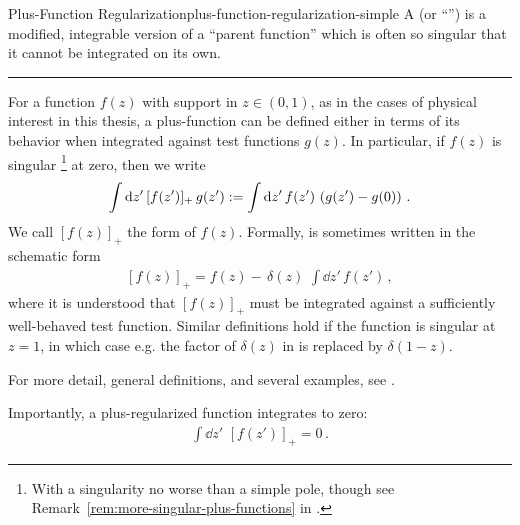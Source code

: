 \begin{definitionbox}{Plus-Function Regularization}{plus-function-regularization-simple}
    A  (or ``'') is a modified, integrable version of a ``parent function'' which is often so singular that it cannot be integrated on its own.

    \vspace{7pt}
    \hrule
    \vspace{7pt}

    For a function \(f(z)\) with support in \(z \in (0,1)\), as in the cases of physical interest in this thesis, a plus-function can be defined either in terms of its behavior when integrated against test functions \(g(z)\).
    In particular, if \(f(z)\) is singular%
    \footnote{With a singularity no worse than a simple pole, though see Remark~\ref{rem:more-singular-plus-functions} in .}
    at zero, then we write
    \begin{align}
        \label{eq:plus-fn-simple-main}
        \int \dd z'
        \,
        [f(z')]_+
        \,
        g(z')
        :=
        \int \dd z'
        \,
        f(z')
        \,
        \le(g(z') - g(0)\ri)
        \,.
    \end{align}
    We call \([f(z)]_+\) the  form of \(f(z)\).
    Formally,  is sometimes written in the schematic form
    \begin{align}
        \label{eq:plus-fn-simple-delta}
        [f(z)]_+
        =
        f(z)
        -
        \,
        \delta(z)
        \,\,
        \int \dd z'
        \,
        f(z')
        \,,
    \end{align}
    where it is understood that \([f(z)]_+\) must be integrated against a sufficiently well-behaved test function.
    Similar definitions hold if the function is singular at \(z=1\), in which case e.g. the factor of \(\delta(z)\) in  is replaced by \(\delta(1-z)\).

    For more detail, general definitions, and several examples, see .
\end{definitionbox}

Importantly, a plus-regularized function integrates to zero:
\begin{align}
    \int\dd z'
    \,\,
    [f(z')]_+
    =
    0
    \,.
\end{align}


